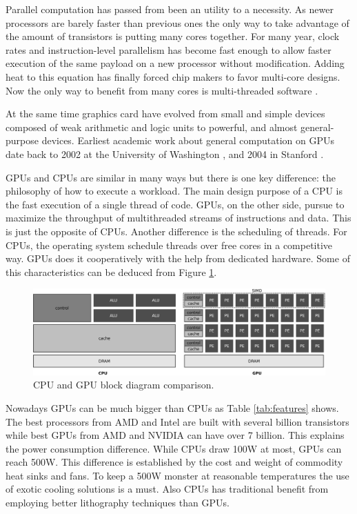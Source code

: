 \documentclass{article}
\begin{document}
Parallel computation has passed from been an utility to a
necessity. As newer processors are barely faster than previous ones
the only way to take advantage of the amount of transistors is putting
many cores together. For many year, clock rates and instruction-level
parallelism has become fast enough to allow faster execution of the
same payload on a new processor without modification. Adding heat to
this equation has finally forced chip makers to favor multi-core
designs. Now the only way to benefit from many cores is multi-threaded
software \cite{6307773}.

At the same time graphics card have evolved from small and simple
devices composed of weak arithmetic and logic units to powerful, and
almost general-purpose devices. Earliest academic work about general
computation on GPUs date back to 2002 at the University of Washington
\cite{Thompson:2002:UMG:774861.774894}, and 2004 in Stanford
\cite{Buck:2004:BGS:1015706.1015800}. %

GPUs and CPUs are similar in many ways but there is one key
difference: the philosophy of how to execute a workload. The main
design purpose of a CPU is the fast execution of a single thread of
code. GPUs, on the other side, pursue to maximize the throughput of
multithreaded streams of instructions and data. This is just the
opposite of CPUs. Another difference is the scheduling of threads. For
CPUs, the operating system schedule threads over free cores in a
competitive way. GPUs does it cooperatively with the help from
dedicated hardware. Some of this characteristics can be deduced from
Figure \ref{fig:cpu-gpu}.

\begin{figure}[!ht]
\centering
\includegraphics[width=\textwidth]{cpu-gpu}
\caption{CPU and GPU block diagram comparison.}
\label{fig:cpu-gpu}
\end{figure}

Nowadays GPUs can be much bigger than CPUs as Table \ref{tab:features}
shows. The best processors from AMD and Intel are built with several
billion transistors while best GPUs from AMD and NVIDIA can have over
7 billion. This explains the power consumption difference. While CPUs
draw 100W at most, GPUs can reach 500W. This difference is established
by the cost and weight of commodity heat sinks and fans. To keep a
500W monster at reasonable temperatures the use of exotic cooling
solutions is a must. Also CPUs has traditional benefit from employing
better lithography techniques than GPUs.  %
\end{document}
